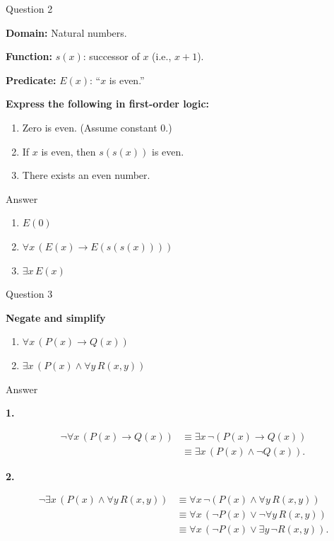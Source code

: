 \documentclass[aspectratio=169,11pt]{beamer}
\begin{document}
\begin{frame}{Question 2}

\textbf{Domain:} Natural numbers.

\textbf{Function:} $s(x)$: successor of $x$ (i.e., $x+1$).

\textbf{Predicate:} $E(x)$: ``$x$ is even.''


\textbf{Express the following in first-order logic:}

\begin{enumerate}
    \item Zero is even. (Assume constant $0$.)
    
    \item If $x$ is even, then $s(s(x))$ is even.
    
    \item There exists an even number.
\end{enumerate}

\begin{block}{Answer}
\begin{enumerate}
    \item $ E(0)$
    \item 
    $\forall x\,(E(x)\to E(s(s(x))))$
    \item 
    $\exists x\,E(x)$
    
\end{enumerate}
\end{block}

\end{frame}
\begin{frame}{Question 3}

\textbf{Negate and simplify }

\begin{enumerate}
    \item
    $\forall x\,(P(x)\to Q(x))$
    \item
    $\exists x\,(P(x)\land\forall y\,R(x,y))$
\end{enumerate}
\begin{block}{Answer}

\textbf{1.}

\[
\begin{aligned}
\neg\forall x\,(P(x)\to Q(x))
&\equiv \exists x\,\neg(P(x)\to Q(x))\\
&\equiv \exists x\,(P(x)\land\neg Q(x)).
\end{aligned}
\]


\textbf{2.}

\[
\begin{aligned}
\neg\exists x\,(P(x)\land\forall y\,R(x,y))
&\equiv \forall x\,\neg(P(x)\land\forall y\,R(x,y))\\
&\equiv \forall x\,(\neg P(x)\lor\neg\forall y\,R(x,y))\\
&\equiv \forall x\,(\neg P(x)\lor\exists y\,\neg R(x,y)).
\end{aligned}
\]

\end{block}
\end{frame}
\end{document}
